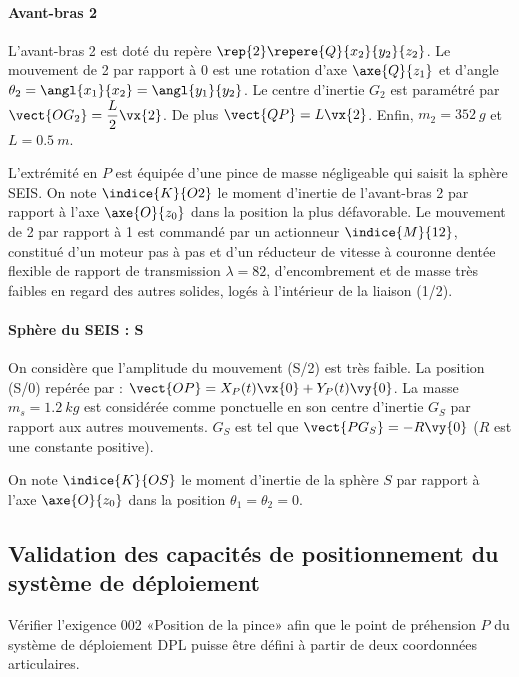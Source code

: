 \paragraph*{Avant-bras 2}
L'avant-bras 2 est doté du repère $\rep{2} \repere{Q}{x_2}{y_2}{z_2}$. Le mouvement de 2 par rapport à 0 est une rotation d'axe $\axe{Q}{z_1}$  et d'angle $\theta_2 = \angl{x_1}{x_2}= \angl{y_1}{y_2}$. Le centre d'inertie $G_2$ est paramétré par $\vect{OG_2} = \dfrac{L}{2} \vx{2}$. De plus $\vect{QP} = L\vx{2}$. Enfin, $m_2 = \SI{352}{g}$ et $L=\SI{0,5}{m}$.

L’extrémité en $P$ est équipée d’une pince de masse négligeable qui saisit la sphère SEIS. On note $\indice{K}{O2}$ le moment d'inertie de l'avant-bras 2 par rapport à l’axe $\axe{O}{z_0}$ dans la position la plus défavorable.  Le mouvement de 2 par rapport à 1 est commandé par un actionneur $\indice{M}{12}$, constitué d’un moteur pas à pas et d’un réducteur de vitesse à couronne dentée flexible de rapport de transmission $\lambda = 82$, d’encombrement et de masse très faibles en regard des autres solides, logés à l’intérieur de la liaison (1/2).


\paragraph*{Sphère du SEIS : S}
On considère que l’amplitude du mouvement (S/2) est très faible. La position (S/0) repérée par : $\vect{OP}= X_P(t) \vx{0} + Y_P(t) \vy{0} $. La masse $m_s = \SI{1,2}{kg}$ est considérée comme ponctuelle en son centre d’inertie $G_S$  par rapport aux autres mouvements. $G_S$  est tel que $\vect{PG_S} = -R \vy{0}$ ($R$ est une constante positive).

On note $\indice{K}{OS}$ le moment d'inertie de la sphère $S$ par rapport à l’axe $\axe{O}{z_0}$  dans la position $\theta_1 =\theta_2 = 0$.



\subsection*{Validation des capacités de positionnement du système de déploiement}

\begin{obj}
Vérifier l’exigence 002 «Position de la pince» afin que le point de préhension $P$ du 
système de déploiement DPL puisse être défini à partir de deux coordonnées articulaires.
\end{obj}


